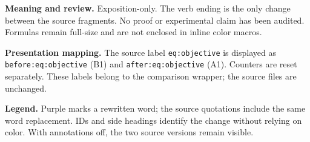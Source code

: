 \documentclass[11pt]{article}
\begin{document}

\textbf{Meaning and review.} Exposition-only. The verb ending is the only
change between the source fragments. No proof or experimental claim has
been audited. Formulas remain full-size and are not enclosed in inline
color macros.

\textbf{Presentation mapping.} The source label \texttt{eq:objective} is
displayed as \texttt{before:eq:objective} (B1) and
\texttt{after:eq:objective} (A1). Counters are reset separately.
These labels belong to the comparison wrapper; the source files are unchanged.

\textbf{Legend.} Purple marks a rewritten word; the source quotations include
the same word replacement. IDs and side headings identify the change without
relying on color. With annotations off, the two source versions remain visible.
\end{document}
